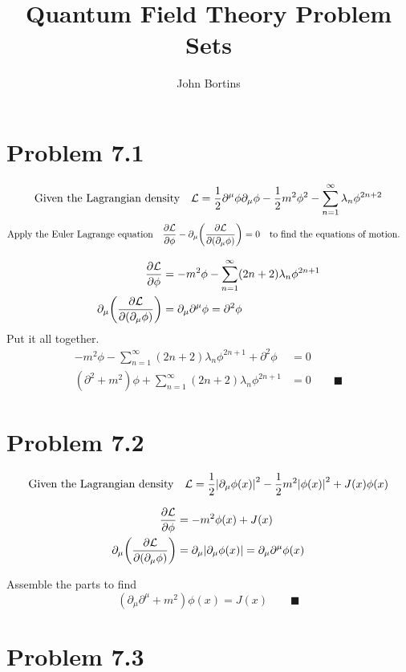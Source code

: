 \documentclass{article}
\title{Quantum Field Theory Problem Sets}
\author{John Bortins}
\begin{document}
 
\maketitle{}
 
\section*{Problem 7.1}



\[ \qq*{Given the Lagrangian density} \mathcal{L}=\frac{1}{2}\partial^{\mu}\phi\partial_{\mu}\phi-\frac{1}{2}m^2\phi^2-\sum_{n=1}^{\infty} \lambda_n \phi^{2n+2} \]
\[ \qq*{Apply the Euler Lagrange equation} \pdv{\mathcal{L}}{\phi}-\partial_{\mu} \qty(\pdv{\mathcal{L}}{\qty(\partial_{\mu}\phi)})=0\qq{to find the equations of motion.} \]

\begin{align*}
\pdv{\mathcal{L}}{\phi}&=-m^2 \phi-\sum_{n=1}^{\infty} (2n+2)\lambda_n \phi^{2n+1}\\
\partial_{\mu} \qty(\pdv{\mathcal{L}}{\qty(\partial_{\mu}\phi)})&=\partial_{\mu}\partial^{\mu}\phi=\partial^2 \phi
\end{align*}
Put it all together.
\begin{align*}
-m^2 \phi-\sum_{n=1}^{\infty} (2n+2)\lambda_n \phi^{2n+1}+\partial^2 \phi &=0 \\
(\partial^2 +m^2)\phi+\sum_{n=1}^{\infty} (2n+2)\lambda_n \phi^{2n+1}&=0\qquad\blacksquare
\end{align*}


\section*{Problem 7.2}



\[ \qq*{Given the Lagrangian density} \mathcal{L}=\frac{1}{2}\qty|\partial_{\mu}\phi(x)|^2-\frac{1}{2}m^2\qty|\phi(x)|^2+J(x)\phi(x) \]

\begin{align*}
\pdv{\mathcal{L}}{\phi}&=-m^2 \phi(x)+J(x)\\
\partial_{\mu} \qty(\pdv{\mathcal{L}}{\qty(\partial_{\mu}\phi)})&=\partial_{\mu}\qty|\partial_{\mu}\phi(x)|=\partial_{\mu}\partial^{\mu}\phi(x)
\end{align*}

Assemble the parts to find
\[(\partial_{\mu}\partial^{\mu}+m^2)\phi(x)=J(x)\qquad\blacksquare
\]

\section*{Problem 7.3}
\end{document}
